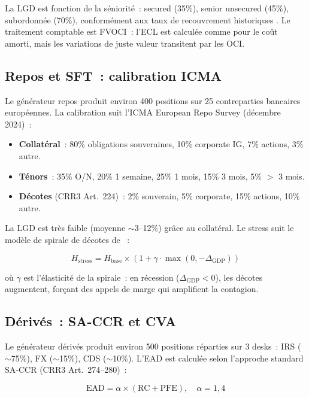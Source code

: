 \documentclass[12pt, a4paper, twoside, openright]{report}
\theoremstyle{definition}
\begin{document}
La LGD est fonction de la séniorité~: secured (35\%), senior unsecured (45\%), subordonnée (70\%), conformément aux taux de recouvrement historiques \citep{altman2006}. Le traitement comptable est FVOCI~: l'ECL est calculée comme pour le coût amorti, mais les variations de juste valeur transitent par les OCI.

\subsection{Repos et SFT~: calibration ICMA}

Le générateur repos produit environ 400 positions sur 25 contreparties bancaires européennes. La calibration suit l'ICMA European Repo Survey (décembre 2024)~:

\begin{itemize}
\item \textbf{Collatéral}~: 80\% obligations souveraines, 10\% corporate IG, 7\% actions, 3\% autre.
\item \textbf{Ténors}~: 35\% O/N, 20\% 1 semaine, 25\% 1 mois, 15\% 3 mois, 5\% $>$ 3 mois.
\item \textbf{Décotes} (CRR3 Art.~224)~: 2\% souverain, 5\% corporate, 15\% actions, 10\% autre.
\end{itemize}

La LGD est très faible (moyenne $\sim$3--12\%) grâce au collatéral. Le stress suit le modèle de spirale de décotes de \citet{brunnermeier2009}~:

\begin{equation}
H_{\text{stress}} = H_{\text{base}} \times \left(1 + \gamma \cdot \max(0, -\Delta_{\text{GDP}})\right)
\label{eq:haircut-spiral}
\end{equation}

\noindent où $\gamma$ est l'élasticité de la spirale~: en récession ($\Delta_{\text{GDP}} < 0$), les décotes augmentent, forçant des appels de marge qui amplifient la contagion.

\subsection{Dérivés~: SA-CCR et CVA}

Le générateur dérivés produit environ 500 positions réparties sur 3 desks~: IRS ($\sim$75\%), FX ($\sim$15\%), CDS ($\sim$10\%). L'EAD est calculée selon l'approche standard SA-CCR (CRR3 Art.~274--280)~:

\begin{equation}
\text{EAD} = \alpha \times (\text{RC} + \text{PFE}), \quad \alpha = 1{,}4
\label{eq:sa-ccr}
\end{equation}
\end{document}
